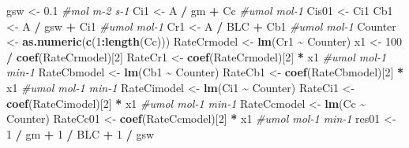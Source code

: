 \documentclass[
]{krantz}
\makeatletter
\newenvironment{Shaded}{\begin{snugshade}}{\end{snugshade}}
\newcommand{\CommentTok}[1]{\textcolor[rgb]{0.56,0.35,0.01}{\textit{#1}}}
\newcommand{\DecValTok}[1]{\textcolor[rgb]{0.00,0.00,0.81}{#1}}
\newcommand{\FloatTok}[1]{\textcolor[rgb]{0.00,0.00,0.81}{#1}}
\newcommand{\KeywordTok}[1]{\textcolor[rgb]{0.13,0.29,0.53}{\textbf{#1}}}
\newcommand{\NormalTok}[1]{#1}
\newcommand{\OperatorTok}[1]{\textcolor[rgb]{0.81,0.36,0.00}{\textbf{#1}}}
\newcommand{\StringTok}[1]{\textcolor[rgb]{0.31,0.60,0.02}{#1}}
\newenvironment{kframe}{%
\medskip{}
\setlength{\fboxsep}{.8em}
 \def\at@end@of@kframe{}%
 \ifinner\ifhmode%
  \def\at@end@of@kframe{\end{minipage}}%
  \begin{minipage}{\columnwidth}%
 \fi\fi%
 \def\FrameCommand##1{\hskip\@totalleftmargin \hskip-\fboxsep
 \colorbox{shadecolor}{##1}\hskip-\fboxsep
     \hskip-\linewidth \hskip-\@totalleftmargin \hskip\columnwidth}%
 \MakeFramed {\advance\hsize-\width
   \@totalleftmargin\z@ \linewidth\hsize
   \@setminipage}}%
 {\par\unskip\endMakeFramed%
 \at@end@of@kframe}
\renewenvironment{Shaded}{\begin{kframe}}{\end{kframe}}
\makeatother
\begin{document}
\begin{Shaded}
\begin{Highlighting}[]
\NormalTok{gsw \textless{}{-}}\StringTok{ }\FloatTok{0.1} \CommentTok{\#mol m{-}2 s{-}1}
\NormalTok{Ci1 \textless{}{-}}\StringTok{ }\NormalTok{A }\OperatorTok{/}\StringTok{ }\NormalTok{gm }\OperatorTok{+}\StringTok{ }\NormalTok{Cc }\CommentTok{\#umol mol{-}1}
\NormalTok{Cis01 \textless{}{-}}\StringTok{ }\NormalTok{Ci1}
\NormalTok{Cb1 \textless{}{-}}\StringTok{ }\NormalTok{A }\OperatorTok{/}\StringTok{ }\NormalTok{gsw }\OperatorTok{+}\StringTok{ }\NormalTok{Ci1 }\CommentTok{\#umol mol{-}1}
\NormalTok{Cr1 \textless{}{-}}\StringTok{ }\NormalTok{A }\OperatorTok{/}\StringTok{ }\NormalTok{BLC }\OperatorTok{+}\StringTok{ }\NormalTok{Cb1 }\CommentTok{\#umol mol{-}1}
\NormalTok{Counter \textless{}{-}}\StringTok{ }\KeywordTok{as.numeric}\NormalTok{(}\KeywordTok{c}\NormalTok{(}\DecValTok{1}\OperatorTok{:}\KeywordTok{length}\NormalTok{(Cc)))}
\NormalTok{RateCrmodel \textless{}{-}}\StringTok{ }\KeywordTok{lm}\NormalTok{(Cr1 }\OperatorTok{\textasciitilde{}}\StringTok{ }\NormalTok{Counter)}
\NormalTok{x1 \textless{}{-}}\StringTok{ }\DecValTok{100} \OperatorTok{/}\StringTok{ }\KeywordTok{coef}\NormalTok{(RateCrmodel)[}\DecValTok{2}\NormalTok{]}
\NormalTok{RateCr1 \textless{}{-}}\StringTok{ }\KeywordTok{coef}\NormalTok{(RateCrmodel)[}\DecValTok{2}\NormalTok{] }\OperatorTok{*}\StringTok{ }\NormalTok{x1 }\CommentTok{\#umol mol{-}1 min{-}1}
\NormalTok{RateCbmodel \textless{}{-}}\StringTok{ }\KeywordTok{lm}\NormalTok{(Cb1 }\OperatorTok{\textasciitilde{}}\StringTok{ }\NormalTok{Counter)}
\NormalTok{RateCb1 \textless{}{-}}\StringTok{ }\KeywordTok{coef}\NormalTok{(RateCbmodel)[}\DecValTok{2}\NormalTok{] }\OperatorTok{*}\StringTok{ }\NormalTok{x1 }\CommentTok{\#umol mol{-}1 min{-}1}
\NormalTok{RateCimodel \textless{}{-}}\StringTok{ }\KeywordTok{lm}\NormalTok{(Ci1 }\OperatorTok{\textasciitilde{}}\StringTok{ }\NormalTok{Counter)}
\NormalTok{RateCi1 \textless{}{-}}\StringTok{ }\KeywordTok{coef}\NormalTok{(RateCimodel)[}\DecValTok{2}\NormalTok{] }\OperatorTok{*}\StringTok{ }\NormalTok{x1 }\CommentTok{\#umol mol{-}1 min{-}1}
\NormalTok{RateCcmodel \textless{}{-}}\StringTok{ }\KeywordTok{lm}\NormalTok{(Cc }\OperatorTok{\textasciitilde{}}\StringTok{ }\NormalTok{Counter)}
\NormalTok{RateCc01 \textless{}{-}}\StringTok{ }\KeywordTok{coef}\NormalTok{(RateCcmodel)[}\DecValTok{2}\NormalTok{] }\OperatorTok{*}\StringTok{ }\NormalTok{x1 }\CommentTok{\#umol mol{-}1 min{-}1}
\NormalTok{res01 \textless{}{-}}\StringTok{ }\DecValTok{1} \OperatorTok{/}\StringTok{ }\NormalTok{gm }\OperatorTok{+}\StringTok{ }\DecValTok{1} \OperatorTok{/}\StringTok{ }\NormalTok{BLC }\OperatorTok{+}\StringTok{ }\DecValTok{1} \OperatorTok{/}\StringTok{ }\NormalTok{gsw}


\end{Highlighting}
\end{Shaded}
\end{document}
